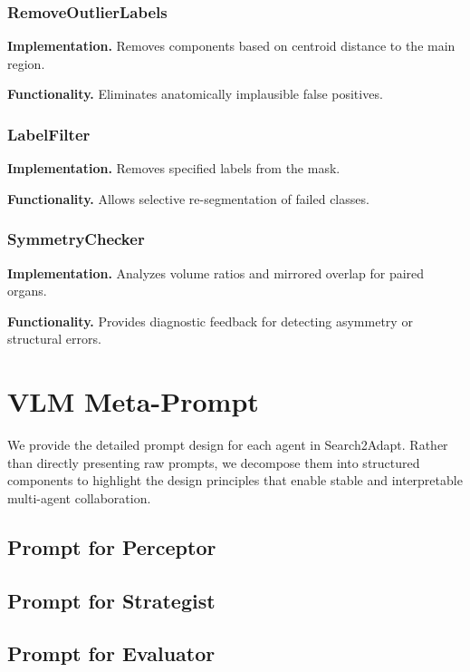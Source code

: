 \documentclass[sigconf]{acmart}
\begin{document}
\subsubsection{RemoveOutlierLabels}

\textbf{Implementation.}
Removes components based on centroid distance to the main region.

\textbf{Functionality.}
Eliminates anatomically implausible false positives.

\subsubsection{LabelFilter}

\textbf{Implementation.}
Removes specified labels from the mask.

\textbf{Functionality.}
Allows selective re-segmentation of failed classes.

\subsubsection{SymmetryChecker}

\textbf{Implementation.}
Analyzes volume ratios and mirrored overlap for paired organs.

\textbf{Functionality.}
Provides diagnostic feedback for detecting asymmetry or structural errors.
\section{VLM Meta-Prompt} %
We provide the detailed prompt design for each agent in Search2Adapt. Rather than directly presenting raw prompts, we decompose them into structured components to highlight the design principles that enable stable and interpretable multi-agent collaboration.
\subsection{Prompt for Perceptor}

\subsection{Prompt for Strategist}
%
\subsection{Prompt for Evaluator}
%
\end{document}

